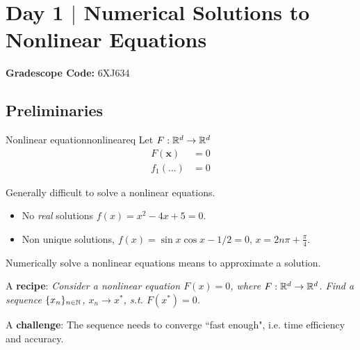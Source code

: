 \documentclass[10pt]{article}
\begin{document}
\thispagestyle{fancy}
\fancyhead[r]{}



\newcommand{\ff}{\mathcal{F}}
\newcommand{\bb}{\mathcal{B}}

\section*{Day 1 $\mid$ Numerical Solutions to Nonlinear Equations} %
\setcounter{section}{1}

\textbf{Gradescope Code:} 6XJ634 

\subsection{Preliminaries}

\begin{mydefinition}{Nonlinear equation}{nonlineareq}
Let $F:\mathbb{R}^{d}\to \mathbb{R}^d$
    \begin{align*}
        F(\bm{x}) &= 0 \\
        f_{1}(...) &=0
    \end{align*} 
\end{mydefinition}


Generally difficult to solve a nonlinear equations.

\begin{itemize}
    \item No \textit{real} solutions $f(x) = x^{2}-4x+5=0$.
    \item Non unique solutions, $f(x)=\sin{x}\cos{x}-1/2=0$, $x=2n\pi +\frac{\pi}{4}$.
\end{itemize}

Numerically solve a nonlinear equations means to approximate a solution.

A \textbf{recipe}: \textit{Consider a nonlinear equation $F(x)=0$, where $F:\mathbb{R}^{d}\to\mathbb{R}^{d}$. Find a sequence $\{x_{n}\}_{n\in\mathbb{N}}$, $x_{n}\to x^{*}$, s.t. $F(x^{*})=0$.}

A \textbf{challenge}: The sequence needs to converge ``fast enough", i.e. time efficiency and accuracy.
\end{document}
